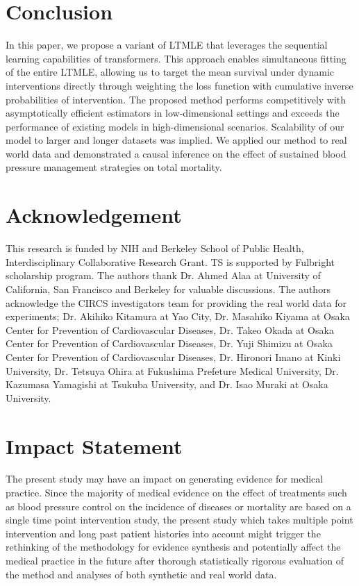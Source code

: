 \documentclass{article}
\theoremstyle{plain}
\theoremstyle{definition}
\theoremstyle{remark}
\begin{document}
\section{Conclusion}

In this paper, we propose a variant of LTMLE that leverages the sequential learning capabilities of transformers. This approach enables simultaneous fitting of the entire LTMLE, allowing us to target the mean survival under dynamic interventions directly through weighting the loss function with cumulative inverse probabilities of intervention. The proposed method performs competitively with asymptotically efficient estimators in low-dimensional settings and exceeds the performance of existing models in high-dimensional scenarios. Scalability of our model to larger and longer datasets was implied. We applied our method to real world data and demonstrated a causal inference on the effect of sustained blood pressure management strategies on total mortality.

\section*{Acknowledgement}
This research is funded by NIH and Berkeley School of Public Health, Interdisciplinary Collaborative Research Grant. TS is supported by Fulbright scholarship program. The authors thank Dr. Ahmed Alaa at University of California, San Francisco and Berkeley for valuable discussions. The authors acknowledge the CIRCS investigators team for providing the real world data for experiments; Dr. Akihiko Kitamura at Yao City, Dr. Masahiko Kiyama at Osaka Center for Prevention of Cardiovascular Diseases, Dr. Takeo Okada at Osaka Center for Prevention of Cardiovascular Diseases, Dr. Yuji Shimizu at Osaka Center for Prevention of Cardiovascular Diseases, Dr. Hironori Imano at Kinki University, Dr. Tetsuya Ohira at Fukushima Prefeture Medical University, Dr. Kazumasa Yamagishi at Tsukuba University, and Dr. Isao Muraki at Osaka University.

\section*{Impact Statement}

The present study may have an impact on generating evidence for medical practice. Since the majority of medical evidence on the effect of treatments such as blood pressure control on the incidence of diseases or mortality are based on a single time point intervention study, the present study which takes multiple point intervention and long past patient histories into account might trigger the rethinking of the methodology for evidence synthesis and potentially affect the medical practice in the future after thorough statistically rigorous evaluation of the method and analyses of both synthetic and real world data.
\end{document}
